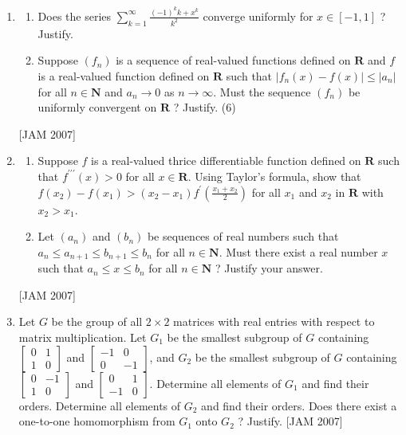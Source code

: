 \begin{enumerate}
\item 
\begin{enumerate}
    \item  Does the series $\sum_{k=1}^{\infty} \frac{(-1)^{k} k+x^{k}}{k^{2}}$ converge uniformly for $x \in[-1,1]$ ? Justify.


    \item  Suppose $\left(f_{n}\right)$ is a sequence of real-valued functions defined on $\mathbf{R}$ and $f$ is a real-valued function defined on $\mathbf{R}$ such that $\left|f_{n}(x)-f(x)\right| \leq\left|a_{n}\right|$ for all $n \in \mathbf{N}$ and $a_{n} \rightarrow 0$ as $n \rightarrow \infty$. Must the sequence $\left(f_{n}\right)$ be uniformly convergent on $\mathbf{R}$ ? Justify. (6) 
\end{enumerate}
\hfill [JAM 2007] 
    
\item 
\begin{enumerate}
    \item  Suppose $f$ is a real-valued thrice differentiable function defined on $\mathbf{R}$ such that $f^{\prime \prime \prime}(x)>0$ for all $x \in \mathbf{R}$. Using Taylor's formula, show that $f\left(x_{2}\right)-f\left(x_{1}\right)>\left(x_{2}-x_{1}\right) f^{\prime}\left(\frac{x_{1}+x_{2}}{2}\right)$ for all $x_{1}$ and $x_{2}$ in $\mathbf{R}$ with $x_{2}>x_{1}$.

\item  Let $\left(a_{n}\right)$ and $\left(b_{n}\right)$ be sequences of real numbers such that $a_{n} \leq a_{n+1} \leq b_{n+1} \leq b_{n}$ for all $n \in \mathbf{N}$. Must there exist a real number $x$ such that $a_{n} \leq x \leq b_{n}$ for all $n \in \mathbf{N}$ ? Justify your answer.
\end{enumerate}
\hfill [JAM 2007] 



  \item Let $G$ be the group of all $2 \times 2$ matrices with real entries with respect to matrix multiplication. Let $G_{1}$ be the smallest subgroup of $G$ containing $\left[\begin{array}{ll}0 & 1 \\ 1 & 0\end{array}\right]$ and $\left[\begin{array}{cc}-1 & 0 \\ 0 & -1\end{array}\right]$, and $G_{2}$ be the smallest subgroup of $G$ containing $\left[\begin{array}{cc}0 & -1 \\ 1 & 0\end{array}\right]$ and $\left[\begin{array}{cc}0 & 1 \\ -1 & 0\end{array}\right]$. Determine all elements of $G_{1}$ and find their orders. Determine all elements of $G_{2}$ and find their orders. Does there exist a one-to-one homomorphism from $G_{1}$ onto $G_{2}$ ? Justify.
 \hfill [JAM 2007] 


\end{enumerate}
